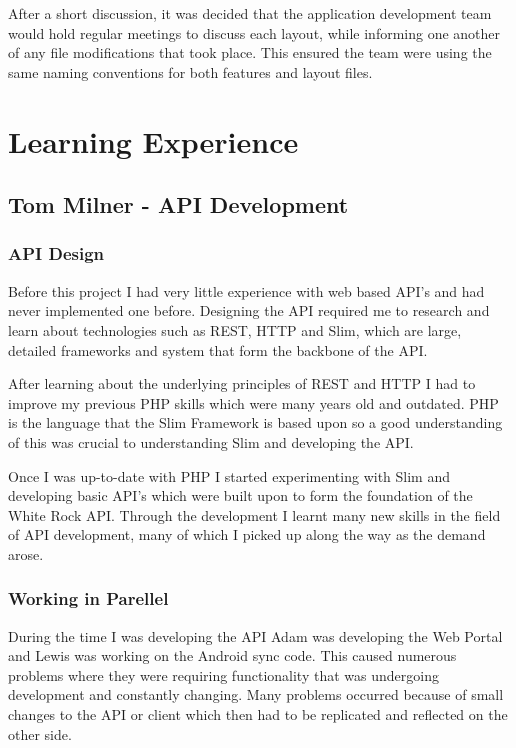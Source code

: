 \documentclass[11pt,a4paper]{report}
\begin{document}
After a short discussion, it was decided that the application development team would hold regular meetings to discuss each layout, while informing one another of any file modifications that took place. This ensured the team were using the same naming conventions for both features and layout files.

\section{Learning Experience}
\label{sec:learning-experience}
\subsection{Tom Milner - API Development}

\subsubsection{API Design}
Before this project I had very little experience with web based API's and had never implemented one before. Designing the API required me to research and learn about technologies such as REST, HTTP and Slim, which are large, detailed frameworks and system that form the backbone of the API.

After learning about the underlying principles of REST and HTTP I had to improve my previous PHP skills which were many years old and outdated. PHP is the language that the Slim Framework is based upon so a good understanding of this was crucial to understanding Slim and developing the API.

Once I was up-to-date with PHP I started experimenting with Slim and developing basic API's which were built upon to form the foundation of the White Rock API. Through the development I learnt many new skills in the field of API development, many of which I picked up along the way as the demand arose.

\subsubsection{Working in Parellel} 
During the time I was developing the API Adam was developing the Web Portal and Lewis was working on the Android sync code. This caused numerous problems where they were requiring functionality that was undergoing development and constantly changing. Many problems occurred because of small changes to the API or client which then had to be replicated and reflected on the other side. 
\end{document}
